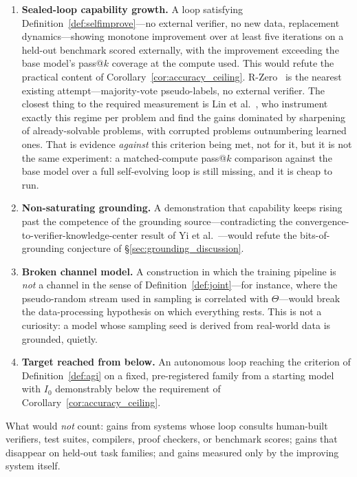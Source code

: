 \documentclass[11pt,a4paper]{article}
\begin{document}
\begin{enumerate}
    \item \textbf{Sealed-loop capability growth.} A loop satisfying Definition~\ref{def:selfimprove}---no external verifier, no new data, replacement dynamics---showing monotone improvement over at least five iterations on a held-out benchmark scored externally, with the improvement exceeding the base model's pass@$k$ coverage at the compute used. This would refute the practical content of Corollary~\ref{cor:accuracy_ceiling}. R-Zero~\cite{huang2025rzero} is the nearest existing attempt---majority-vote pseudo-labels, no external verifier. The closest thing to the required measurement is Lin et al.~\cite{lin2026ttrl}, who instrument exactly this regime per problem and find the gains dominated by sharpening of already-solvable problems, with corrupted problems outnumbering learned ones. That is evidence \emph{against} this criterion being met, not for it, but it is not the same experiment: a matched-compute pass@$k$ comparison against the base model over a full self-evolving loop is still missing, and it is cheap to run.
    \item \textbf{Non-saturating grounding.} A demonstration that capability keeps rising past the competence of the grounding source---contradicting the convergence-to-verifier-knowledge-center result of Yi et al.~\cite{yi2026escaping}---would refute the bits-of-grounding conjecture of \S\ref{sec:grounding_discussion}.
    \item \textbf{Broken channel model.} A construction in which the training pipeline is \emph{not} a channel in the sense of Definition~\ref{def:joint}---for instance, where the pseudo-random stream used in sampling is correlated with $\Theta$---would break the data-processing hypothesis on which everything rests. This is not a curiosity: a model whose sampling seed is derived from real-world data is grounded, quietly.
    \item \textbf{Target reached from below.} An autonomous loop reaching the criterion of Definition~\ref{def:agi} on a fixed, pre-registered family from a starting model with $I_0$ demonstrably below the requirement of Corollary~\ref{cor:accuracy_ceiling}.
\end{enumerate}

What would \emph{not} count: gains from systems whose loop consults human-built verifiers, test suites, compilers, proof checkers, or benchmark scores; gains that disappear on held-out task families; and gains measured only by the improving system itself.
\end{document}
